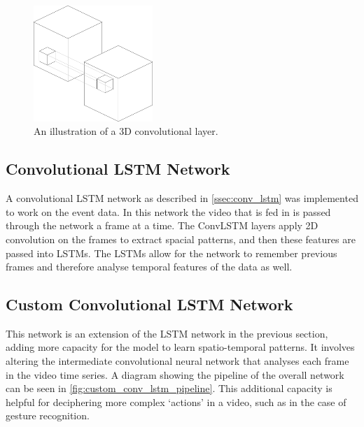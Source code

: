 \begin{figure}[htb]
    \centering
    \includegraphics[width=0.4\textwidth]{analysisanddesign/images/conv3d_diagram.png}
    \caption{An illustration of a 3D convolutional layer.}
    \label{fig:conv3d_diagram}
\end{figure}

\subsection{Convolutional LSTM Network}

A convolutional LSTM network as described in \cref{ssec:conv_lstm} was implemented to work on the event data. In this network the video that is fed in is passed through the network a frame at a time. The ConvLSTM layers apply 2D convolution on the frames to extract spacial patterns, and then these features are passed into LSTMs. The LSTMs allow for the network to remember previous frames and therefore analyse temporal features of the data as well.

\subsection{Custom Convolutional LSTM Network}

This network is an extension of the LSTM network in the previous section, adding more capacity for the model to learn spatio-temporal patterns. It involves altering the intermediate convolutional neural network that analyses each frame in the video time series. A diagram showing the pipeline of the overall network can be seen in \cref{fig:custom_conv_lstm_pipeline}. This additional capacity is helpful for deciphering more complex `actions' in a video, such as in the case of gesture recognition.

